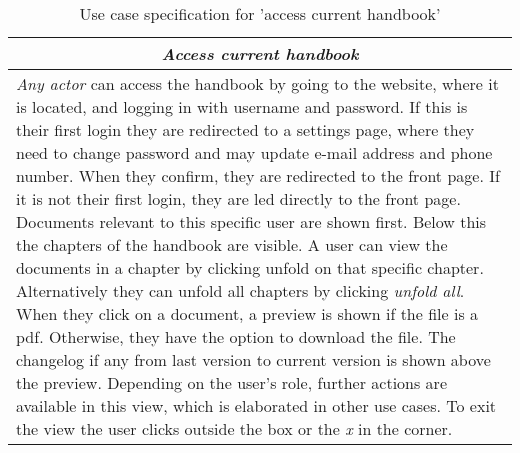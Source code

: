 \begin{table}[H]
\centering
\begin{tabular}{p{14.5cm}}
\hline
\multicolumn{1}{c}{\textit{\textbf{Access current handbook}}} \\
\hline
\textit{Any actor} can access the handbook by going to the website, where it is located, and logging in with username and password.
If this is their first login they are redirected to a settings page, where they need to change password and may update e-mail address and phone number.
When they confirm, they are redirected to the front page.
If it is not their first login, they are led directly to the front page.
Documents relevant to this specific user are shown first.
Below this the chapters of the handbook are visible.
A user can view the documents in a chapter by clicking unfold on that specific chapter.
Alternatively they can unfold all chapters by clicking \textit{unfold all}.
When they click on a document, a preview is shown if the file is a pdf.
Otherwise, they have the option to download the file.
The changelog if any from last version to current version is shown above the preview.
Depending on the user's role, further actions are available in this view, which is elaborated in other use cases.
To exit the view the user clicks outside the box or the \textit{x} in the corner.
\\\hline
\end{tabular}
\caption{Use case specification for 'access current handbook'}\label{tab:access-handbook}
\end{table}
